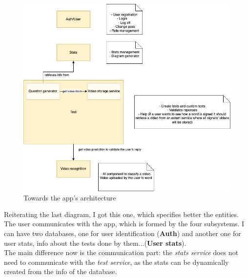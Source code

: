 \begin{figure}[H]
    \centering
        \includegraphics[width=\textwidth]{assets/diagrams/services.png}
    \caption{Towards the app's architecture}
    \label{fig:design_architecture_first}
\end{figure}

Reiterating the last diagram, I got this one, which specifies better the entities. The user communicates with the app, which is formed by the four subsystems. I can have two databases, one for user identification (\textbf{Auth}) and another one for user stats, info about the tests done by them...(\textbf{User stats}). \\

The main difference now is the communication part: the \textit{stats service} does not need to communicate with the \textit{test service}, as the stats can be dynamically created from the info of the database. 

